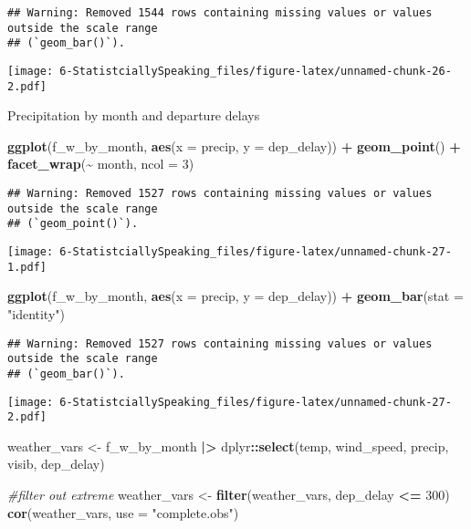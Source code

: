 \documentclass[
]{article}
\newenvironment{Shaded}{\begin{snugshade}}{\end{snugshade}}
\newcommand{\AttributeTok}[1]{\textcolor[rgb]{0.13,0.29,0.53}{#1}}
\newcommand{\CommentTok}[1]{\textcolor[rgb]{0.56,0.35,0.01}{\textit{#1}}}
\newcommand{\DecValTok}[1]{\textcolor[rgb]{0.00,0.00,0.81}{#1}}
\newcommand{\FunctionTok}[1]{\textcolor[rgb]{0.13,0.29,0.53}{\textbf{#1}}}
\newcommand{\NormalTok}[1]{#1}
\newcommand{\OtherTok}[1]{\textcolor[rgb]{0.56,0.35,0.01}{#1}}
\newcommand{\SpecialCharTok}[1]{\textcolor[rgb]{0.81,0.36,0.00}{\textbf{#1}}}
\newcommand{\StringTok}[1]{\textcolor[rgb]{0.31,0.60,0.02}{#1}}
\begin{document}
\begin{verbatim}
## Warning: Removed 1544 rows containing missing values or values outside the scale range
## (`geom_bar()`).
\end{verbatim}

\texttt{[image: 6-StatistciallySpeaking\_files/figure-latex/unnamed-chunk-26-2.pdf]}

Precipitation by month and departure delays

\begin{Shaded}
\begin{Highlighting}[]
\FunctionTok{ggplot}\NormalTok{(f\_w\_by\_month, }\FunctionTok{aes}\NormalTok{(}\AttributeTok{x =}\NormalTok{ precip, }\AttributeTok{y =}\NormalTok{ dep\_delay)) }\SpecialCharTok{+} 
  \FunctionTok{geom\_point}\NormalTok{() }\SpecialCharTok{+}
  \FunctionTok{facet\_wrap}\NormalTok{(}\SpecialCharTok{\textasciitilde{}}\NormalTok{ month, }\AttributeTok{ncol =} \DecValTok{3}\NormalTok{)}
\end{Highlighting}
\end{Shaded}

\begin{verbatim}
## Warning: Removed 1527 rows containing missing values or values outside the scale range
## (`geom_point()`).
\end{verbatim}

\texttt{[image: 6-StatistciallySpeaking\_files/figure-latex/unnamed-chunk-27-1.pdf]}

\begin{Shaded}
\begin{Highlighting}[]
\FunctionTok{ggplot}\NormalTok{(f\_w\_by\_month, }\FunctionTok{aes}\NormalTok{(}\AttributeTok{x =}\NormalTok{ precip, }\AttributeTok{y =}\NormalTok{ dep\_delay)) }\SpecialCharTok{+}
  \FunctionTok{geom\_bar}\NormalTok{(}\AttributeTok{stat =} \StringTok{"identity"}\NormalTok{)}
\end{Highlighting}
\end{Shaded}

\begin{verbatim}
## Warning: Removed 1527 rows containing missing values or values outside the scale range
## (`geom_bar()`).
\end{verbatim}

\texttt{[image: 6-StatistciallySpeaking\_files/figure-latex/unnamed-chunk-27-2.pdf]}

\begin{Shaded}
\begin{Highlighting}[]
\NormalTok{weather\_vars }\OtherTok{\textless{}{-}}\NormalTok{ f\_w\_by\_month }\SpecialCharTok{|\textgreater{}}
\NormalTok{  dplyr}\SpecialCharTok{::}\FunctionTok{select}\NormalTok{(temp, wind\_speed, precip, visib, dep\_delay)}

\CommentTok{\#filter out extreme}
\NormalTok{weather\_vars }\OtherTok{\textless{}{-}} \FunctionTok{filter}\NormalTok{(weather\_vars, dep\_delay }\SpecialCharTok{\textless{}=} \DecValTok{300}\NormalTok{)}
\FunctionTok{cor}\NormalTok{(weather\_vars, }\AttributeTok{use =} \StringTok{"complete.obs"}\NormalTok{)}
\end{Highlighting}
\end{Shaded}
\end{document}

